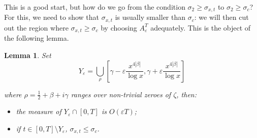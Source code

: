 \documentclass{article}
\newcommand{\1}{\mathds{1}}
\numberwithin{equation}{section}
\newcommand{\eps}{\varepsilon}
\renewcommand{\leq}{\leqslant}
\renewcommand{\geq}{\geqslant}
\theoremstyle{plain} %
\newtheorem{lemma}[theorem]{Lemma}
\newcommand{\hf}{\frac{1}{2}}
\begin{document}
This is a good start, but how do we go from the condition $\sigma_2 \geq \sigma_{x, t}$ to $\sigma_2 \geq \sigma_c$? For this, we need to show that $\sigma_{x, t}$ is usually smaller than $\sigma_c$: we will then cut out the region where $\sigma_{x, t} \geq \sigma_c$ by choosing $A_\eps^T$ adequately. This is the object of the following lemma.
\begin{lemma}
\label{cutset}
Set
    \begin{equation}
    Y_{\eps} = \bigcup_{\rho} [\gamma - \eps\frac{x^{4 |\beta|}}{\log x}, \gamma + \eps\frac{x^{4|\beta|}}{\log x}]
\end{equation}

where $\rho = \hf + \beta + i \gamma$ ranges over non-trivial zeroes of $\zeta$, then:
\begin{itemize}
    \item the measure of $Y_{\eps} \cap [0, T]$ is $O(\eps T)$;
    \item if $t \in  [0, T] \setminus Y_\eps$, $\sigma_{x, t} \leq \sigma_c$.
\end{itemize}
\end{lemma}
\end{document}
